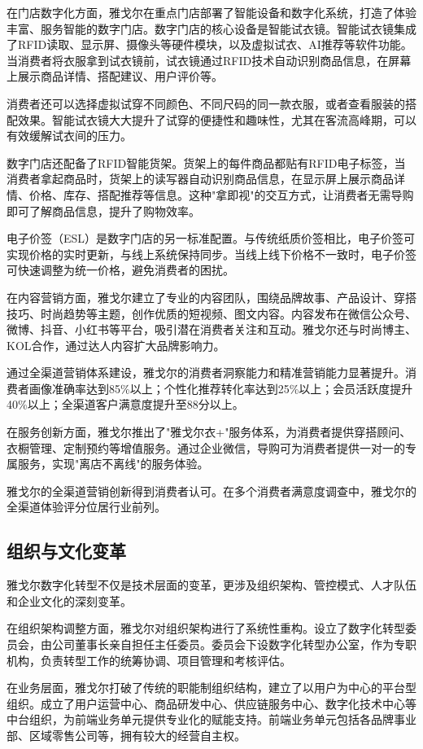 \documentclass[12pt,a4paper]{article}
\begin{document}
在门店数字化方面，雅戈尔在重点门店部署了智能设备和数字化系统，打造了体验丰富、服务智能的数字门店。数字门店的核心设备是智能试衣镜。智能试衣镜集成了RFID读取、显示屏、摄像头等硬件模块，以及虚拟试衣、AI推荐等软件功能。当消费者将衣服拿到试衣镜前，试衣镜通过RFID技术自动识别商品信息，在屏幕上展示商品详情、搭配建议、用户评价等。

消费者还可以选择虚拟试穿不同颜色、不同尺码的同一款衣服，或者查看服装的搭配效果。智能试衣镜大大提升了试穿的便捷性和趣味性，尤其在客流高峰期，可以有效缓解试衣间的压力。

数字门店还配备了RFID智能货架。货架上的每件商品都贴有RFID电子标签，当消费者拿起商品时，货架上的读写器自动识别商品信息，在显示屏上展示商品详情、价格、库存、搭配推荐等信息。这种"拿即视"的交互方式，让消费者无需导购即可了解商品信息，提升了购物效率。

电子价签（ESL）是数字门店的另一标准配置。与传统纸质价签相比，电子价签可实现价格的实时更新，与线上系统保持同步。当线上线下价格不一致时，电子价签可快速调整为统一价格，避免消费者的困扰。

在内容营销方面，雅戈尔建立了专业的内容团队，围绕品牌故事、产品设计、穿搭技巧、时尚趋势等主题，创作优质的短视频、图文内容。内容发布在微信公众号、微博、抖音、小红书等平台，吸引潜在消费者关注和互动。雅戈尔还与时尚博主、KOL合作，通过达人内容扩大品牌影响力。

通过全渠道营销体系建设，雅戈尔的消费者洞察能力和精准营销能力显著提升。消费者画像准确率达到85\%以上；个性化推荐转化率达到25\%以上；会员活跃度提升40\%以上；全渠道客户满意度提升至88分以上。

在服务创新方面，雅戈尔推出了"雅戈尔衣+"服务体系，为消费者提供穿搭顾问、衣橱管理、定制预约等增值服务。通过企业微信，导购可为消费者提供一对一的专属服务，实现"离店不离线"的服务体验。

雅戈尔的全渠道营销创新得到消费者认可。在多个消费者满意度调查中，雅戈尔的全渠道体验评分位居行业前列。

\subsection{组织与文化变革}

雅戈尔数字化转型不仅是技术层面的变革，更涉及组织架构、管控模式、人才队伍和企业文化的深刻变革。

在组织架构调整方面，雅戈尔对组织架构进行了系统性重构。设立了数字化转型委员会，由公司董事长亲自担任主任委员。委员会下设数字化转型办公室，作为专职机构，负责转型工作的统筹协调、项目管理和考核评估。

在业务层面，雅戈尔打破了传统的职能制组织结构，建立了以用户为中心的平台型组织。成立了用户运营中心、商品研发中心、供应链服务中心、数字化技术中心等中台组织，为前端业务单元提供专业化的赋能支持。前端业务单元包括各品牌事业部、区域零售公司等，拥有较大的经营自主权。
\end{document}
